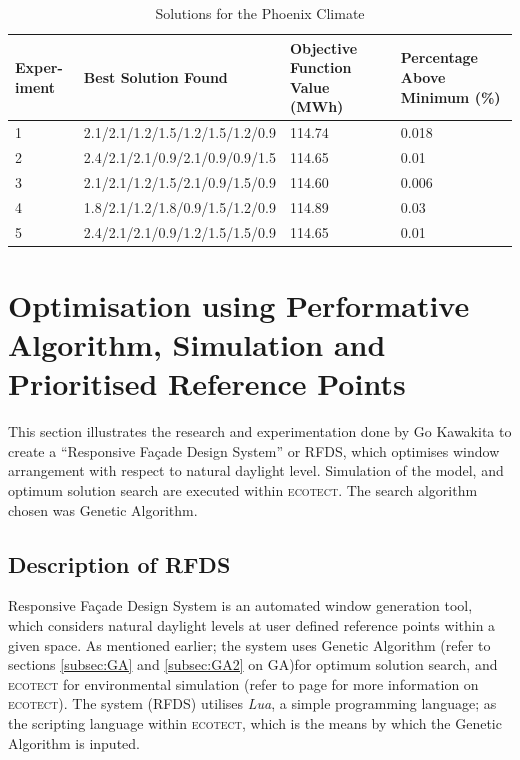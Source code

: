 \begin{table}[h]
\centering
\begin{tabular}{|p{1.5cm}|p{6cm}|p{2cm}|p{2.2cm}|}
\hline
\textbf{Exper-\newline iment}&\textbf{Best Solution Found}&\textbf{Objective Function Value (MWh)}&\textbf{Percentage Above Minimum (\%)}\\ \hline
1&2.1/2.1/1.2/1.5/1.2/1.5/1.2/0.9&114.74&0.018\\ \hline
2&2.4/2.1/2.1/0.9/2.1/0.9/0.9/1.5&114.65&0.01\\ \hline
3&2.1/2.1/1.2/1.5/2.1/0.9/1.5/0.9&114.60&0.006\\ \hline
4&1.8/2.1/1.2/1.8/0.9/1.5/1.2/0.9&114.89&0.03\\ \hline
5&2.4/2.1/2.1/0.9/1.2/1.5/1.5/0.9&114.65&0.01\\ \hline
\end{tabular}
\label{tab:PhoenixSolutions}
\caption[Solutions for the Phoenix Climate]{Solutions for the Phoenix Climate \cite{caldas01}}
\end{table}

\clearpage

\section{Optimisation using Performative Algorithm, Simulation and Prioritised Reference Points}
\label{sec:RFDS}

This section illustrates the research and experimentation done by Go Kawakita \cite{kawakita08} to create a ``Responsive Fa\c{c}ade Design System'' or RFDS, which optimises window arrangement with respect to natural daylight level. Simulation of the model, and optimum solution search are executed within \textsc{ecotect}. The search algorithm chosen was Genetic Algorithm.

\subsection{Description of RFDS}

Responsive Fa\c{c}ade Design System is an automated window generation tool, which considers natural daylight levels at user defined reference points within a given space. As mentioned earlier; the system uses Genetic Algorithm (refer to sections \ref{subsec:GA} and \ref{subsec:GA2} on GA)for optimum solution search, and \textsc{ecotect} for environmental simulation (refer to page \pageref{par:ECOTECT} for more information on \textsc{ecotect}). The system (RFDS) utilises \emph{Lua}, a simple programming language; as the scripting language within \textsc{ecotect}, which is the means by which the Genetic Algorithm is inputed.

